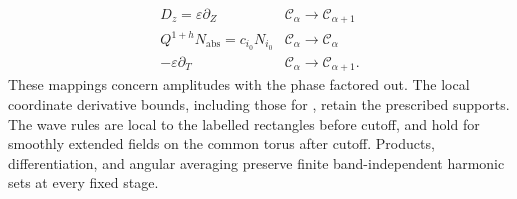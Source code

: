 \begin{proposition}
\begin{equation}
\begin{array}{c|c}
    D_z=\varepsilon\partial_Z&\mathcal C_\alpha\longrightarrow \mathcal C_{\alpha+1}\\
    Q^{1+h}N_{\mathrm{abs}}=c_{i_0}N_{i_0}
      &\mathcal C_\alpha\longrightarrow \mathcal C_\alpha\\
    -\varepsilon\partial_T&\mathcal C_\alpha\longrightarrow \mathcal C_{\alpha+1}.
  \end{array}
  \tag{6.32}\label{eq:6.32}
\end{equation}
These mappings concern amplitudes with the phase factored out. The local
coordinate derivative bounds, including those for
, retain the prescribed supports. The wave
rules are local to the labelled rectangles before cutoff, and hold for
smoothly extended fields on the common torus after cutoff. Products,
differentiation, and angular averaging preserve finite band-independent
harmonic sets at every fixed stage.
\end{proposition}


